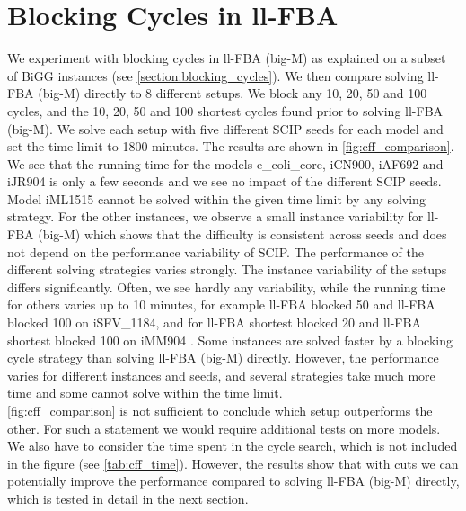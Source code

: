 \section{Blocking Cycles in ll-FBA} \label{section:results_blocking_cycles}
We experiment with blocking cycles in \textsf{ll-FBA (big-M)} as explained on a subset of BiGG instances (see \cref{section:blocking_cycles}).
We then compare solving \textsf{ll-FBA (big-M)} directly to 8 different setups. We block any 10, 20, 50 and 100 cycles, and the 10, 20, 50 and 100 shortest cycles found prior to solving \textsf{ll-FBA (big-M)}. 
We solve each setup with five different \textsf{SCIP} seeds for each model and set the time limit to 1800 minutes. The results are shown in \cref{fig:cff_comparison}.\\
We see that the running time for the models \textsf{e\_coli\_core}, \textsf{iCN900}, \textsf{iAF692} and \textsf{iJR904} is only a few seconds and we see no impact of the different \textsf{SCIP} seeds. Model \textsf{iML1515} cannot be solved within the given time limit by any solving strategy. For the other instances, we observe a small instance variability for \textsf{ll-FBA (big-M)} which shows that the difficulty is consistent across seeds and does not depend on the performance variability of \textsf{SCIP}. The performance of the different solving strategies varies strongly. 
The instance variability of the setups differs significantly. Often, we see hardly any variability, while the running time for others varies up to 10 minutes, for example \textsf{ll-FBA blocked 50} and \textsf{ll-FBA blocked 100} on \textsf{iSFV\_1184}, and for \textsf{ll-FBA shortest blocked 20} and \textsf{ll-FBA shortest blocked 100} on \textsf{iMM904} . Some instances are solved faster by a blocking cycle strategy than solving \textsf{ll-FBA (big-M)} directly. However, the performance varies for different instances and seeds, and several strategies take much more time and some cannot solve within the time limit.\\
\cref{fig:cff_comparison} is not sufficient to conclude which setup outperforms the other. For such a statement we would require additional tests on more models. 
We also have to consider the time spent in the cycle search, which is not included in the figure (see \cref{tab:cff_time}).
However, the results show that with cuts we can potentially improve the performance compared to solving \textsf{ll-FBA (big-M)} directly, which is tested in detail in the next section.


